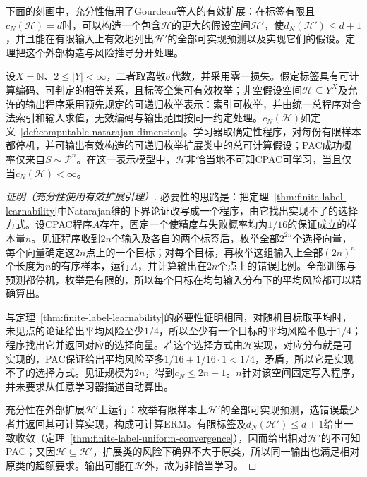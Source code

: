 下面的刻画中，充分性借用了Gourdeau等人的有效扩展：在标签有限且$c_N(\mathcal H)=d$时，可以构造一个包含$\mathcal H$的更大的假设空间$\mathcal H'$，使$d_N(\mathcal H')\leq d+1$，并且能在有限输入上有效地列出$\mathcal H'$的全部可实现预测以及实现它们的假设。定理把这个外部构造与风险推导分开处理。

\begin{theorem}[有限标签的非恰当CPAC刻画]
\label{thm:computable-multiclass-characterization}
设$X=\mathbb N$、$2\leq|Y|<\infty$，二者取离散$\sigma$代数，并采用零一损失。假定标签具有可计算编码、可判定的相等关系，且标签全集可有效枚举；非空假设空间$\mathcal H\subseteq Y^X$及允许的输出程序采用预先规定的可递归枚举表示：索引可枚举，并由统一总程序对合法索引和输入求值，无效编码与输出范围按同一约定处理。$c_N(\mathcal H)$如定义~\ref{def:computable-natarajan-dimension}。学习器取确定性程序，对每份有限样本都停机，并可输出有效构造的可递归枚举扩展类中的总可计算假设；PAC成功概率仅来自$S\sim\mathcal P^n$。在这一表示模型中，$\mathcal H$非恰当地不可知CPAC可学习，当且仅当$c_N(\mathcal H)<\infty$。
\end{theorem}

\begin{proof}[证明（充分性使用有效扩展引理）]
必要性的思路是：把定理~\ref{thm:finite-label-learnability}中Natarajan维的下界论证改写成一个程序，由它找出实现不了的选择方式。设CPAC程序$A$存在，固定一个使精度与失败概率均为$1/16$的保证成立的样本量$n$。见证程序收到$2n$个输入及各自的两个标签后，枚举全部$2^{2n}$个选择向量，每个向量确定这$2n$点上的一个目标；对每个目标，再枚举这组输入上全部$(2n)^n$个长度为$n$的有序样本，运行$A$，并计算输出在$2n$个点上的错误比例。全部训练与预测都停机，枚举是有限的，所以每个目标在均匀输入分布下的平均风险都可以精确算出。

与定理~\ref{thm:finite-label-learnability}的必要性证明相同，对随机目标取平均时，未见点的论证给出平均风险至少$1/4$，所以至少有一个目标的平均风险不低于$1/4$；程序找出它并返回对应的选择向量。若这个选择方式由$\mathcal H$实现，对应分布就是可实现的，PAC保证给出平均风险至多$1/16+1/16\cdot1<1/4$，矛盾，所以它是实现不了的选择方式。见证规模为$2n$，得到$c_N\leq2n-1$。$n$针对该空间固定写入程序，并未要求从任意学习器描述自动算出。

充分性在外部扩展$\mathcal H'$上运行：枚举有限样本上$\mathcal H'$的全部可实现预测，选错误最少者并返回其可计算实现，构成可计算ERM。有限标签及$d_N(\mathcal H')\leq d+1$给出一致收敛（定理~\ref{thm:finite-label-uniform-convergence}），因而给出相对$\mathcal H'$的不可知PAC；又因$\mathcal H\subseteq\mathcal H'$，扩展类的风险下确界不大于原类，所以同一输出也满足相对原类的超额要求。输出可能在$\mathcal H$外，故为非恰当学习。
\end{proof}

